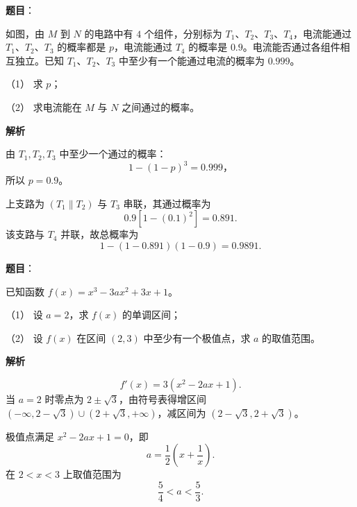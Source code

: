 \begin{answer}

\textbf{题目}：

如图，由 $M$ 到 $N$ 的电路中有 $4$ 个组件，分别标为 $T_1\text{、}T_2\text{、}T_3\text{、}T_4$，电流能通过 $T_1\text{、}T_2\text{、}T_3$ 的概率都是 $p$，电流能通过 $T_4$ 的概率是 $0.9$。电流能否通过各组件相互独立。已知 $T_1\text{、}T_2\text{、}T_3$ 中至少有一个能通过电流的概率为 $0.999$。
\nopagebreak[4]
\begin{center}\end{center}
\nopagebreak[4]
（1） 求 $p$；

（2） 求电流能在 $M$ 与 $N$ 之间通过的概率。

\textbf{解析}


由 $T_1,T_2,T_3$ 中至少一个通过的概率：
\nopagebreak[4]
\[
1-(1-p)^3=0.999\text{，}
\]
所以 $p=0.9$。


上支路为 $(T_1\parallel T_2)$ 与 $T_3$ 串联，其通过概率为
\nopagebreak[4]
\[
0.9[1-(0.1)^2]=0.891.
\]
该支路与 $T_4$ 并联，故总概率为
\nopagebreak[4]
\[
1-(1-0.891)(1-0.9)=0.9891.
\]



\end{answer}
\begin{answer}

\textbf{题目}：

已知函数 $f(x)=x^3-3ax^2+3x+1$。

（1） 设 $a=2$，求 $f(x)$ 的单调区间；

（2） 设 $f(x)$ 在区间 $(2,3)$ 中至少有一个极值点，求 $a$ 的取值范围。

\textbf{解析}


\nopagebreak[4]
\[
f'(x)=3(x^2-2ax+1).
\]
当 $a=2$ 时零点为 $2\pm\sqrt3$，由符号表得增区间
$(-\infty,2-\sqrt3)\cup(2+\sqrt3,+\infty)$，减区间为
$(2-\sqrt3,2+\sqrt3)$。


极值点满足 $x^2-2ax+1=0$，即
\nopagebreak[4]
\[
a=\frac12\left(x+\frac1x\right).
\]
在 $2<x<3$ 上取值范围为
\nopagebreak[4]
\[
\frac54<a<\frac53.
\]



\end{answer}
